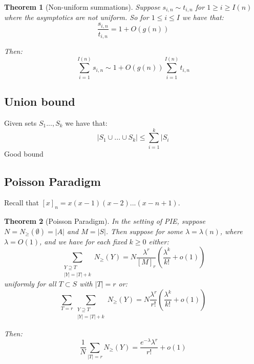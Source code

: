 \documentclass[]{article}
\newtheorem{theorem}{Theorem}
\theoremstyle{definition}
\numberwithin{theorem}{section}
\numberwithin{equation}{section}
\begin{document}
\begin{theorem}[Non-uniform summations]
	Suppose $s_{i, n} \sim t_{i, n}$ for $ 1\geq i \geq I(n)$ where the asymptotics are not uniform. So for $1 \leq i \leq I$ we have that:
	\begin{equation}
		\frac{s_{i, n}}{t_{i, n}} = 1 + O(g(n))
	\end{equation}
	
	Then:
	\begin{equation}
		\sum_{i = 1}^{I(n)} s_{i, n} \sim 1 + O(g(n))\sum_{i = 1}^{I(n)} t_{i, n}
	\end{equation}
\end{theorem}

\subsection{Union bound}
Given sets $S_1 ..., S_k$ we have that:
\begin{equation}
	|S_1 \cup ... \cup S_k | \leq \sum_{i = 1}^k |S_i
\end{equation}
Good bound
\subsection{Poisson Paradigm}

Recall that $[x]_n = x( x - 1) (x - 2) ... (x - n + 1)$. 
\begin{theorem}[Poisson Paradigm]
	In the setting of PIE, suppose $N = N_\geq(\emptyset) = |A|$ and $M = |S|$. Then suppose for some $\lambda = \lambda(n)$, where $\lambda = O(1)$, and we have for each fixed $k \geq 0$ either:
	\begin{equation}
		\sum_{\substack{Y \supseteq T\\ |Y| = |T| + k}} N_{\geq}(Y) = N \frac{\lambda^r}{[M]_r} \left(\frac{\lambda^k}{k!} + o(1)\right)
	\end{equation}
	uniformly for all $T \subset S$ with $|T| = r$ or:
	\begin{equation}
		\sum_{T = r} \sum_{\substack{Y \supseteq T\\ |Y| = |T| + k}} N_{\geq}(Y) = N \frac{\lambda^r}{r!} \left(\frac{\lambda^k}{k!} + o(1)\right)
	\end{equation}
	
	Then:
	\begin{equation}
		\frac{1}{N}\sum_{|T| = r} N_{\geq}(Y) = \frac{e^{-\lambda}\lambda^r}{r!} + o(1)
	\end{equation}
	
\end{theorem}
\end{document}
